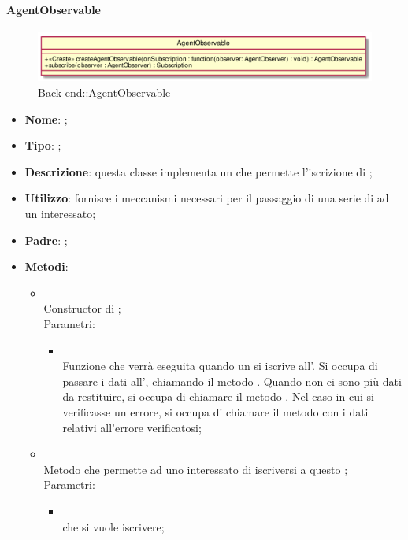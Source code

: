 \hypertarget{AgentObservable_label}{\paragraph{AgentObservable}}
\begin{figure}[h]
	\centering
	\includegraphics[width=\textwidth,height=\textheight,keepaspectratio]{images/ClassAgentObservable.png}
	\caption{Back-end::AgentObservable}
\end{figure}
\begin{itemize}
	\item \textbf{Nome}: ;
	\item \textbf{Tipo}: ;
	\item \textbf{Descrizione}: questa classe implementa un  che permette l'iscrizione di ;
	\item \textbf{Utilizzo}: fornisce i meccanismi necessari per il passaggio di una serie di  ad un  interessato;
	\item \textbf{Padre}: ;
	\item \textbf{Metodi}:
	\begin{itemize}
		\item[]  \\
		Constructor di ;\\
		Parametri:
		\begin{itemize}
			\item {} \\
			Funzione che verrà eseguita quando un  si iscrive all'. Si occupa di passare i dati all', chiamando il metodo . Quando non ci sono più dati da restituire, si occupa di chiamare il metodo . Nel caso in cui si verificasse un errore, si occupa di chiamare il metodo  con i dati relativi all'errore verificatosi;
		\end{itemize}
		\item[]  \\
		Metodo che permette ad uno  interessato di iscriversi a questo ;\\
		Parametri:
		\begin{itemize}
			\item {} \\
			 che si vuole iscrivere;
		\end{itemize}
	\end{itemize}
\end{itemize}
\FloatBarrier

